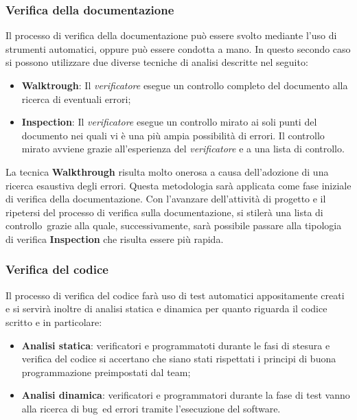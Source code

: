     \subsubsection{Verifica della documentazione}
    Il processo di verifica della documentazione può essere svolto mediante l'uso di strumenti automatici, oppure può essere condotta a mano. In questo secondo caso si possono utilizzare due diverse tecniche di analisi descritte nel seguito:
    \begin{itemize}
        \item \textbf{Walktrough}: Il \textit{verificatore} esegue un controllo completo del documento alla ricerca di eventuali errori;
        \item \textbf{Inspection}: Il \textit{verificatore} esegue un controllo mirato ai soli punti del documento nei quali vi è una più ampia possibilità di errori. Il controllo mirato avviene grazie all'esperienza del \textit{verificatore} e a una lista di controllo\glo.
    \end{itemize}
    La tecnica \textbf{Walkthrough} risulta molto onerosa a causa dell’adozione di una ricerca esaustiva degli errori. Questa metodologia sarà applicata come fase iniziale di verifica della documentazione. Con l'avanzare dell’attività di progetto e il ripetersi del processo di verifica sulla documentazione, si stilerà una lista di controllo\glo\ grazie alla quale, successivamente, sarà possibile passare alla tipologia di verifica \textbf{Inspection} che risulta essere più rapida.

    \subsubsection{Verifica del codice}
    Il processo di verifica del codice farà uso di test automatici appositamente creati e si servirà inoltre di analisi statica e dinamica per quanto riguarda il codice scritto e in particolare:
    \begin{itemize}
        \item \textbf{Analisi statica}: verificatori e programmatoti durante le fasi di stesura e verifica del codice si accertano che siano stati rispettati i principi di buona programmazione preimpostati dal team;
        \item \textbf{Analisi dinamica}: verificatori e programmatori durante la fase di test vanno alla ricerca di bug\glo\ ed errori tramite l'esecuzione del software.  
    \end{itemize}

